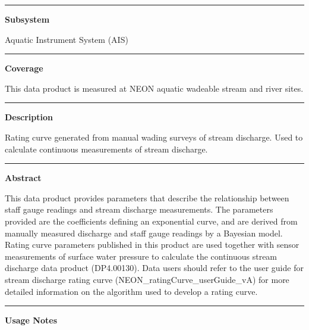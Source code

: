 \documentclass[]{article}
\begin{document}
\begin{center}\rule{0.5\linewidth}{\linethickness}\end{center}

\textbf{Subsystem}

Aquatic Instrument System (AIS)

\begin{center}\rule{0.5\linewidth}{\linethickness}\end{center}

\textbf{Coverage}

This data product is measured at NEON aquatic wadeable stream and river
sites.

\begin{center}\rule{0.5\linewidth}{\linethickness}\end{center}

\textbf{Description}

Rating curve generated from manual wading surveys of stream discharge.
Used to calculate continuous measurements of stream discharge.

\begin{center}\rule{0.5\linewidth}{\linethickness}\end{center}

\textbf{Abstract}

This data product provides parameters that describe the relationship
between staff gauge readings and stream discharge measurements. The
parameters provided are the coefficients defining an exponential curve,
and are derived from manually measured discharge and staff gauge
readings by a Bayesian model. Rating curve parameters published in this
product are used together with sensor measurements of surface water
pressure to calculate the continuous stream discharge data product
(DP4.00130). Data users should refer to the user guide for stream
discharge rating curve (NEON\_ratingCurve\_userGuide\_vA) for more
detailed information on the algorithm used to develop a rating curve.

\begin{center}\rule{0.5\linewidth}{\linethickness}\end{center}

\textbf{Usage Notes}
\end{document}
